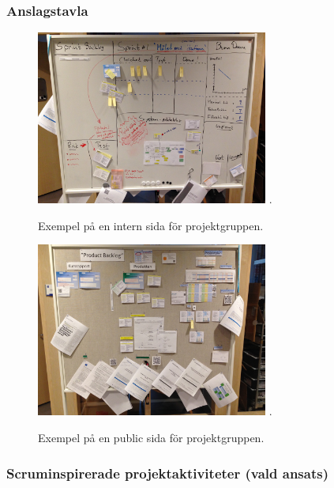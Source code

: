 \documentclass[conference]{IEEEtran}
\begin{document}
\subsubsection{Anslagstavla}

\begin{figure}[!ht]
\centering
\includegraphics[width=3in]{sprintbacklog}
\DeclareGraphicsExtensions.
\caption{Exempel på en intern sida för projektgruppen.}
\label{sprintbacklog}
\end{figure}

\begin{figure}[!ht]
\centering
\includegraphics[width=3in]{productbacklog}
\DeclareGraphicsExtensions.
\caption{Exempel på en public sida för projektgruppen.}
\label{productbacklog}
\end{figure}

\subsubsection{Scruminspirerade projektaktiviteter (vald ansats)}



\end{document}
